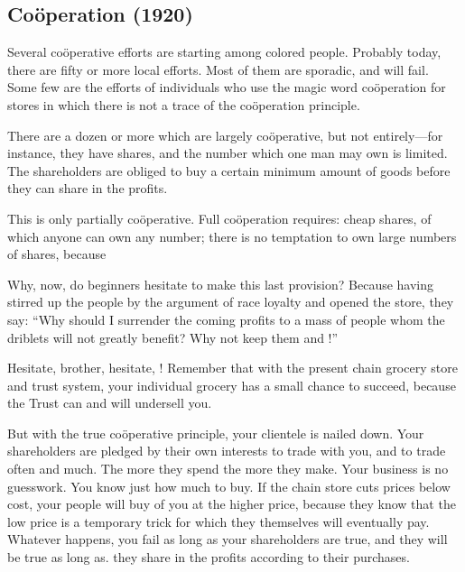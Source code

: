 \documentclass[letterpaper,10pt,english]{jupyterBook}
\begin{document}
\subsection{Coöperation (1920)}
\label{\detokenize{Volumes/19/04/cooperation:cooperation-1920}}\label{\detokenize{Volumes/19/04/cooperation::doc}}
\sphinxAtStartPar
Several coöperative efforts are starting among colored people. Probably today, there are fifty or more local efforts. Most of them are sporadic, and will fail. Some few are the efforts of individuals who use the magic word coöperation for stores in which there is not a trace of the coöperation principle.

\sphinxAtStartPar
There are a dozen or more which are largely coöperative, but not entirely—for instance, they have shares, and the number which one man may own is limited. The shareholders are obliged to buy a certain minimum amount of goods before they can share in the profits.

\sphinxAtStartPar
This is only partially coöperative. Full coöperation requires: cheap shares, of which anyone can own any number;  there is no temptation to own large numbers of shares, because 

\sphinxAtStartPar
Why, now, do beginners hesitate to make this last provision? Because having stirred up the people by the argument of race loyalty and opened the store, they say: “Why should I surrender the coming profits to a mass of people whom the driblets will not greatly benefit? Why not keep them and !”

\sphinxAtStartPar
Hesitate, brother, hesitate, ! Remember that with the present chain grocery store and trust system, your individual grocery has a small chance to succeed, because the Trust can and will undersell you.

\sphinxAtStartPar
But with the true coöperative principle, your clientele is nailed down. Your shareholders are pledged by their own interests to trade with you, and to trade often and much. The more they spend the more they make. Your business is no guesswork. You know just how much to buy. If the chain store cuts prices below cost, your people will buy of you at the higher price, because they know that the low price is a temporary trick for which they themselves will eventually pay. Whatever happens, you  fail as long as your shareholders are true, and they will be true as long as. they share in the profits according to their purchases.
\end{document}
